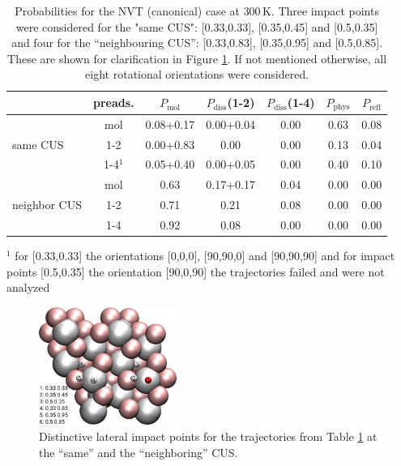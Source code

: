 \documentclass[11pt,DIV=13,BCOR=5mm,a4paper,headinclude]{scrbook}
\begin{document}
\begin{table}[hbt]
 \centering
  \caption{
  Probabilities for the NVT (canonical) case at $300\,$K.
Three impact points were considered for the "same CUS": [0.33,0.33], [0.35,0.45] and [0.5,0.35]  and four for the ``neighbouring CUS'': [0.33,0.83], [0.35,0.95] and [0.5,0.85].
These are shown for clarification in Figure \ref{fig:impact}.
If not mentioned otherwise, all eight rotational orientations were considered.}
 \begin{tabular}{l|c|ccccc}
\toprule
& preads. &$P_\textrm{mol}$ & $P_\textrm{diss}$(1-2) &  $P_\textrm{diss}$(1-4) & $P_\textrm{phys}$ & $P_\textrm{refl}$ \\\midrule
\multirow{3}{*}{same CUS}& mol &0.08+0.17 & 0.00+0.04 & 0.00 &  0.63 & 0.08 \\
& 1-2 &0.00+0.83 & 0.00 & 0.00 &  0.13 & 0.04 \\
& 1-4$^1$ &0.05+0.40 & 0.00+0.05 & 0.00 & 0.40 & 0.10 \\\midrule
\multirow{3}{*}{neighbor CUS}& mol &0.63 & 0.17+0.17 & 0.04  & 0.00 & 0.00 \\
& 1-2 & 0.71 & 0.21 & 0.08& 0.00 & 0.00\\
& 1-4 & 0.92 & 0.08 & 0.00 & 0.00 & 0.00\\\bottomrule
\end{tabular}
\begin{tablenotes}
 \footnotesize
\item[] $^1$ for [0.33,0.33] the orientations [0,0,0], [90,90,0] and [90,90,90] and for impact points [0.5,0.35] the orientation [90,0,90] the trajectories failed and were not analyzed
\end{tablenotes}
 \label{tab:enh_can}
\end{table}
\begin{figure}[!h]
 \centering
 \includegraphics[width=0.4\textwidth]{figures/0001/points_same_other.png}
 \caption{Distinctive lateral impact points for the trajectories from Table \ref{tab:enh_can} at the ``same'' and the ``neighboring'' CUS.}
 \label{fig:impact}
 \end{figure}
\end{document}
